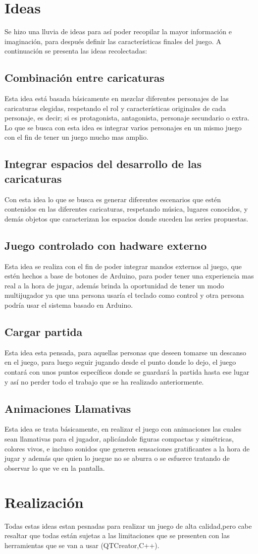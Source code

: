 \documentclass{article}
\begin{document}
\section{Ideas} \label{ideas}
Se hizo una lluvia de ideas para así poder recopilar la mayor información e imaginación, para después definir las características finales del juego. A continuación se presenta las ideas recolectadas:

\subsection{Combinación entre caricaturas}
Esta idea está basada básicamente en mezclar diferentes personajes de las  caricaturas elegidas, respetando el rol y características originales de cada personaje, es decir; si es protagonista, antagonista, personaje secundario o extra. Lo que se busca con esta idea es integrar varios personajes en un mismo juego con el fin de tener un juego mucho mas amplio.
\subsection{Integrar espacios del desarrollo de las caricaturas }
Con esta idea lo que se busca es generar diferentes escenarios que estén contenidos en las diferentes caricaturas, respetando música, lugares conocidos, y demás objetos que caracterizan los espacios donde suceden las series propuestas.
\subsection{Juego controlado con hadware externo} 
Esta idea se realiza con el fin de poder integrar mandos externos al juego, que estén hechos a base de botones de Arduino, para poder tener una experiencia mas real a la hora de jugar, además brinda la oportunidad de tener un modo multijugador ya que una persona usaría el teclado como control y otra persona podría usar el sistema basado en Arduino.
\subsection{Cargar partida}
Esta idea esta pensada, para aquellas personas que deseen tomarse un descanso en el juego, para luego seguir jugando desde el punto donde lo dejo, el juego contará con unos puntos específicos donde se guardará la partida hasta ese lugar y así no perder todo el trabajo que se ha realizado anteriormente.
\subsection{Animaciones Llamativas}
Esta idea se trata básicamente, en realizar el juego con animaciones las cuales sean llamativas para el jugador, aplicándole figuras compactas y simétricas, colores vivos, e incluso sonidos que generen sensaciones gratificantes a la hora de jugar y además que quien lo juegue no se aburra o se esfuerce tratando de observar lo que ve en la pantalla.

\section{Realización}
Todas estas ideas estan pesnadas para realizar un juego de alta calidad,pero cabe resaltar que todas están sujetas a las limitaciones que se presenten con las herramientas que se van a usar (QTCreator,C++).
\end{document}

